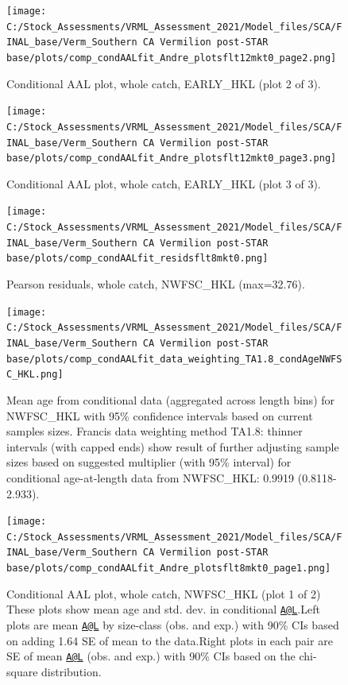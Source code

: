 \documentclass[11pt,
  english,
]{article}
\begin{document}
\begin{figure}
\centering
\texttt{[image: C:/Stock\_Assessments/VRML\_Assessment\_2021/Model\_files/SCA/FINAL\_base/Verm\_Southern CA Vermilion post-STAR base/plots/comp\_condAALfit\_Andre\_plotsflt12mkt0\_page2.png]}
\caption{Conditional AAL plot, whole catch, EARLY\_HKL (plot 2 of 3).\label{fig:comp_condAALfit_Andre_plotsflt12mkt0_page2}}
\end{figure}

\begin{figure}
\centering
\texttt{[image: C:/Stock\_Assessments/VRML\_Assessment\_2021/Model\_files/SCA/FINAL\_base/Verm\_Southern CA Vermilion post-STAR base/plots/comp\_condAALfit\_Andre\_plotsflt12mkt0\_page3.png]}
\caption{Conditional AAL plot, whole catch, EARLY\_HKL (plot 3 of 3).\label{fig:comp_condAALfit_Andre_plotsflt12mkt0_page3}}
\end{figure}

\begin{figure}
\centering
\texttt{[image: C:/Stock\_Assessments/VRML\_Assessment\_2021/Model\_files/SCA/FINAL\_base/Verm\_Southern CA Vermilion post-STAR base/plots/comp\_condAALfit\_residsflt8mkt0.png]}
\caption{Pearson residuals, whole catch, NWFSC\_HKL (max=32.76).\label{fig:comp_condAALfit_residsflt8mkt0}}
\end{figure}

\begin{figure}
\centering
\texttt{[image: C:/Stock\_Assessments/VRML\_Assessment\_2021/Model\_files/SCA/FINAL\_base/Verm\_Southern CA Vermilion post-STAR base/plots/comp\_condAALfit\_data\_weighting\_TA1.8\_condAgeNWFSC\_HKL.png]}
\caption{Mean age from conditional data (aggregated across length bins) for NWFSC\_HKL with 95\% confidence intervals based on current samples sizes. Francis data weighting method TA1.8: thinner intervals (with capped ends) show result of further adjusting sample sizes based on suggested multiplier (with 95\% interval) for conditional age-at-length data from NWFSC\_HKL: 0.9919 (0.8118-2.933).\label{fig:comp_condAALfit_data_weighting_TA1.8_condAgeNWFSC_HKL}}
\end{figure}

\begin{figure}
\centering
\texttt{[image: C:/Stock\_Assessments/VRML\_Assessment\_2021/Model\_files/SCA/FINAL\_base/Verm\_Southern CA Vermilion post-STAR base/plots/comp\_condAALfit\_Andre\_plotsflt8mkt0\_page1.png]}
\caption{Conditional AAL plot, whole catch, NWFSC\_HKL (plot 1 of 2) These plots show mean age and std. dev. in conditional {\href{mailto:A@L}{\nolinkurl{A@L}}\leavevmode\tagmcend\tagstructend}.Left plots are mean {\href{mailto:A@L}{\nolinkurl{A@L}}\leavevmode\tagmcend\tagstructend} by size-class (obs. and exp.) with 90\% CIs based on adding 1.64 SE of mean to the data.Right plots in each pair are SE of mean {\href{mailto:A@L}{\nolinkurl{A@L}}\leavevmode\tagmcend\tagstructend} (obs. and exp.) with 90\% CIs based on the chi-square distribution.\label{fig:comp_condAALfit_Andre_plotsflt8mkt0_page1}}
\end{figure}
\end{document}

